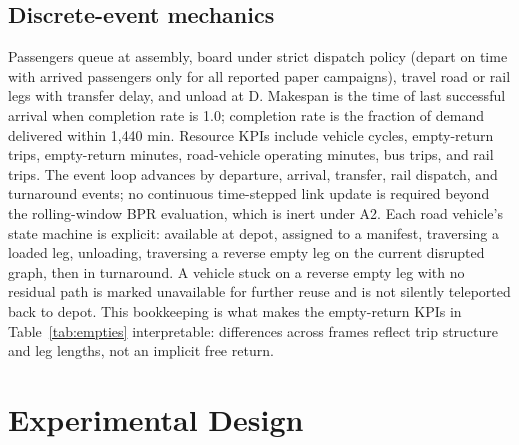 \documentclass{ieeeaccess}
\begin{document}
\subsection{Discrete-event mechanics}
Passengers queue at assembly, board under strict dispatch policy (depart on time with arrived passengers only for all reported paper campaigns), travel road or rail legs with transfer delay, and unload at D. Makespan is the time of last successful arrival when completion rate is 1.0; completion rate is the fraction of demand delivered within 1{,}440 min. Resource KPIs include vehicle cycles, empty-return trips, empty-return minutes, road-vehicle operating minutes, bus trips, and rail trips. The event loop advances by departure, arrival, transfer, rail dispatch, and turnaround events; no continuous time-stepped link update is required beyond the rolling-window BPR evaluation, which is inert under A2. Each road vehicle's state machine is explicit: available at depot, assigned to a manifest, traversing a loaded leg, unloading, traversing a reverse empty leg on the current disrupted graph, then in turnaround. A vehicle stuck on a reverse empty leg with no residual path is marked unavailable for further reuse and is not silently teleported back to depot. This bookkeeping is what makes the empty-return KPIs in Table~\ref{tab:empties} interpretable: differences across frames reflect trip structure and leg lengths, not an implicit free return.

\section{Experimental Design}
\label{sec:design}
\end{document}
